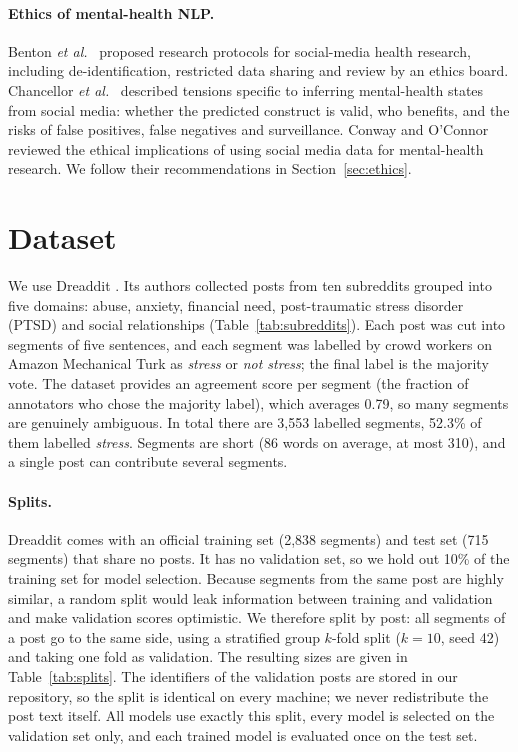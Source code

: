 \paragraph{Ethics of mental-health NLP.}
Benton {\it et al.}~ proposed research protocols for social-media health research, including
de-identification, restricted data sharing and review by an ethics board.
Chancellor {\it et al.}~ described tensions specific to inferring mental-health states from
social media: whether the predicted construct is valid, who benefits, and the risks of
false positives, false negatives and surveillance. Conway and O'Connor~ reviewed the ethical
implications of using social media data for mental-health research. We follow their recommendations
in Section~\ref{sec:ethics}.

\section{Dataset}
\label{sec:data}
We use Dreaddit \cite{turcan2019dreaddit}. Its authors collected posts from ten subreddits grouped
into five domains: abuse, anxiety, financial need, post-traumatic stress disorder (PTSD) and social
relationships (Table~\ref{tab:subreddits}). Each post was cut into segments of five sentences, and
each segment was labelled by crowd workers on Amazon Mechanical Turk as \emph{stress} or
\emph{not stress}; the final label is the majority vote. The dataset provides an agreement score per
segment (the fraction of annotators who chose the majority label), which averages 0.79, so many
segments are genuinely ambiguous. In total there are 3,553 labelled segments, 52.3\% of them labelled
\emph{stress}. Segments are short (86 words on average, at most 310), and a single post can contribute
several segments.

\paragraph{Splits.} Dreaddit comes with an official training set (2,838 segments) and test set (715
segments) that share no posts. It has no validation set, so we hold out 10\% of the training set
for model selection. Because segments from the same post are highly similar, a random split would
leak information between training and validation and make validation scores optimistic. We
therefore split by post: all segments of a post go to the same side, using a stratified group
$k$-fold split ($k=10$, seed 42) and taking one fold as validation. The resulting sizes are given in
Table~\ref{tab:splits}. The identifiers of the validation posts are stored in our repository, so the
split is identical on every machine; we never redistribute the post text itself. All models use
exactly this split, every model is selected on the validation set only, and each trained model is
evaluated once on the test set.

